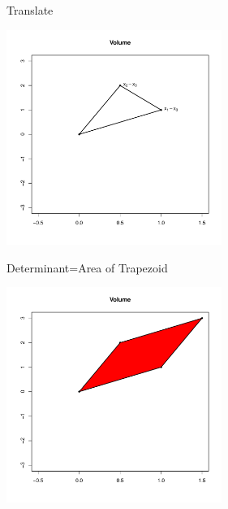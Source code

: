 \documentclass[10pt]{beamer}
\begin{document}
                                                                                              \begin{frame}{Translate}
                                                                                                \begin{center}
                                                                                                  \includegraphics[height=7cm]{RCode/geom2.pdf}
                                                                                                \end{center}
                                                                                              \end{frame}
                                                                                              \begin{frame}{Determinant=Area of Trapezoid}
                                                                                                \begin{center}
                                                                                                  \includegraphics[height=7cm]{RCode/geom3.pdf}
                                                                                                \end{center}
                                                                                              \end{frame}
\end{document}
